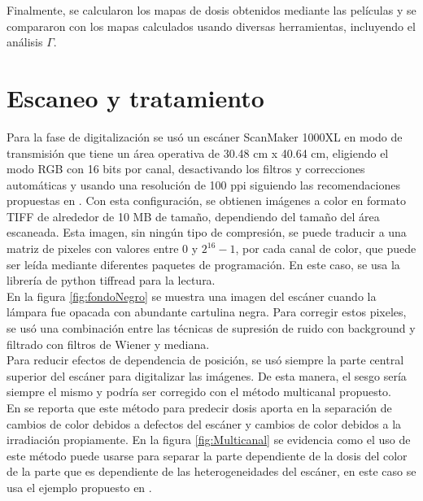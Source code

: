 Finalmente, se calcularon los mapas de dosis obtenidos mediante las películas y se compararon con los mapas calculados usando diversas herramientas, incluyendo el análisis $\Gamma$.

\section{Escaneo y tratamiento}
Para la fase de digitalización se usó un escáner ScanMaker 1000XL en modo de transmisión que tiene un área operativa de 30.48 cm x 40.64 cm, eligiendo el modo RGB con 16 bits por canal, desactivando los filtros y correcciones automáticas y usando una resolución de 100 ppi siguiendo las recomendaciones propuestas en \cite{Devic2016}. Con esta configuración, se obtienen imágenes a color en formato TIFF de alrededor de 10 MB de tamaño, dependiendo del tamaño del área escaneada. Esta imagen, sin ningún tipo de compresión, se puede traducir a una matriz de pixeles con valores entre $0$ y $2^{16}-1$, por cada canal de color, que puede ser leída mediante diferentes paquetes de programación. En este caso, se usa la librería de python tiffread para la lectura. \\



En la figura \ref{fig:fondoNegro} se muestra una imagen del escáner cuando la lámpara fue opacada con abundante cartulina negra. Para corregir estos pixeles, se usó una combinación entre las técnicas de supresión de ruido con background y filtrado con filtros de Wiener y mediana. \\

Para reducir efectos de dependencia de posición, se usó siempre la parte central superior del escáner para digitalizar las imágenes. De esta manera, el sesgo sería siempre el mismo y podría ser corregido con el método multicanal propuesto.\\

En \cite{Micke2011} se reporta que este método para predecir dosis aporta en la separación de cambios de color debidos a defectos del escáner y cambios de color debidos a la irradiación propiamente. En la figura \ref{fig:Multicanal} se evidencia como el uso de este método puede usarse para separar la parte dependiente de la dosis del color de la parte que es dependiente de las heterogeneidades del escáner, en este caso se usa el ejemplo propuesto en \cite{Micke2011}. \\

